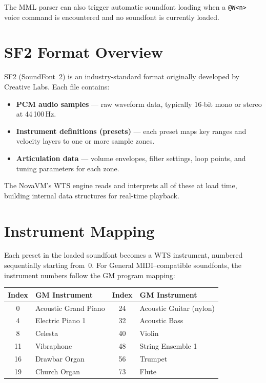 \begin{notebox}
The MML parser can also trigger automatic soundfont loading when a
\texttt{@W\textless n\textgreater} voice command is encountered and no soundfont
is currently loaded.
\end{notebox}


\section{SF2 Format Overview}
\label{sec:sf2-format}

SF2 (SoundFont~2) is an industry-standard format originally developed by
Creative Labs.  Each file contains:

\begin{itemize}
  \item \textbf{PCM audio samples} --- raw waveform data, typically 16-bit mono
        or stereo at 44\,100\,Hz.
  \item \textbf{Instrument definitions (presets)} --- each preset maps key ranges
        and velocity layers to one or more sample zones.
  \item \textbf{Articulation data} --- volume envelopes, filter settings, loop
        points, and tuning parameters for each zone.
\end{itemize}

The NovaVM's WTS engine reads and interprets all of these at load time, building
internal data structures for real-time playback.


\section{Instrument Mapping}
\label{sec:wts-instruments}

Each preset in the loaded soundfont becomes a WTS instrument, numbered
sequentially starting from~0.  For General MIDI--compatible soundfonts, the
instrument numbers follow the GM program mapping:

\begin{center}
\small
\begin{tabular}{@{}cl@{\qquad}cl@{}}
\toprule
\textbf{Index} & \textbf{GM Instrument} &
\textbf{Index} & \textbf{GM Instrument} \\
\midrule
0   & Acoustic Grand Piano & 24  & Acoustic Guitar (nylon) \\
4   & Electric Piano 1     & 32  & Acoustic Bass \\
8   & Celesta              & 40  & Violin \\
11  & Vibraphone           & 48  & String Ensemble 1 \\
16  & Drawbar Organ        & 56  & Trumpet \\
19  & Church Organ         & 73  & Flute \\
\bottomrule
\end{tabular}
\end{center}

